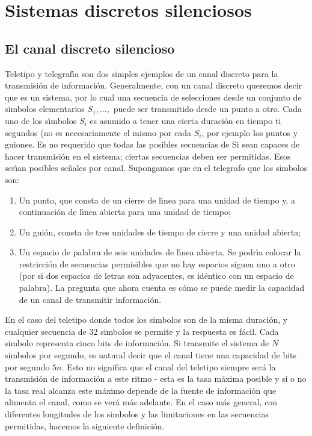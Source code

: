
\clearpage

\part{Sistemas discretos silenciosos}
\label{part:1}

\chapter{El canal discreto silencioso}
\label{sec:1}

Teletipo y telegraf\'{\i}a son dos simples ejemplos de un canal
discreto para la transmisi\'{o}n de informaci\'{o}n. Generalmente, con
un canal discreto queremos decir que es un sistema, por lo cual una
secuencia de selecciones desde un conjunto de simbolos elementarios
$S_1,\ldots,$ puede ser transmitido desde un punto a otro. Cada uno de
los s\'{\i}mbolos $S_i$ es asumido a tener una cierta duraci\'{o}n en
tiempo ti segundos (no es necesariamente el mismo por cada $S_i$, por
ejemplo los puntos y guiones. Es no requerido que todas las posibles
secuencias de Si sean capaces de hacer transmisi\'{o}n en el sistema;
ciertas secuencias deben ser permitidas. Esos ser\'{\i}an posibles
se\~{n}ales por canal. Supongamos que en el telegrafo que los simbolos
son: 
\begin{enumerate}
\item{Un punto, que consta de un cierre de l\'{\i}nea para una
unidad de tiempo y, a continuaci\'{o}n de l\'{\i}nea abierta para una
unidad de tiempo;}
\item{Un gui\'{o}n, consta de tres unidades de tiempo
de cierre y una unidad abierta;}
\item{Un espacio de palabra de seis
unidades de l\'{\i}nea abierta. Se podr\'{\i}a colocar la
restricci\'{o}n de secuencias permisibles que no hay espacios siguen
uno a otro (por si dos espacios de letras son adyacentes, es
id\'{e}ntico con un espacio de palabra). La pregunta que ahora cuenta
es c\'{o}mo se puede medir la capacidad de un canal de transmitir
informaci\'{o}n.}
\end{enumerate}

En el caso del teletipo donde todos los simbolos son de la misma
duraci\'{o}n, y cualquier secuencia de 32 simbolos se permite y la
respuesta es f\'{a}cil. Cada simbolo representa cinco bits de
informaci\'{o}n. Si transmite el sistema de $N$ simbolos por segundo,
es natural decir que el canal tiene una capacidad de bits por segundo
$5 n$. Esto no significa que el canal del teletipo siempre ser\'{a} la
transmisi\'{o}n de informaci\'{o}n a este ritmo - esta es la tasa
m\'{a}xima posible y si o no la tasa real alcanza este m\'{a}ximo
depende de la fuente de informaci\'{o}n que alimenta el canal, como se
ver\'{a} m\'{a}s adelante. En el caso m\'{a}s general, con diferentes
longitudes de los simbolos y las limitaciones en las secuencias
permitidas, hacemos la siguiente definici\'{o}n.

